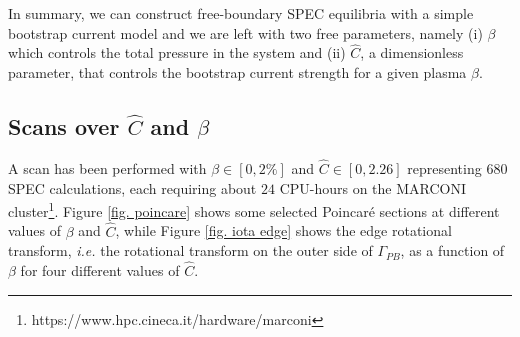 \documentclass[my_thesis.tex]{subfiles}
\begin{document}
In summary, we can construct free-boundary SPEC equilibria with a simple bootstrap current model and we are left with two free parameters, namely (i) $\beta$ which controls the total pressure in the system and (ii) $\hat{C}$, a dimensionless parameter, that controls the bootstrap current strength for a given plasma $\beta$. 
	
	
	






\subsection{Scans over $\hat{C}$ and $\beta$}
A scan has been performed with $\beta\in[0,2\%]$ and $\hat{C}\in[0,2.26]$ representing $680$ SPEC calculations, each requiring about $24$ CPU-hours on the MARCONI cluster\footnote{https://www.hpc.cineca.it/hardware/marconi}. Figure \ref{fig. poincare} shows some selected Poincar\'e sections at different values of $\beta$ and $\hat{C}$, while Figure \ref{fig. iota edge} shows the edge rotational transform, \textit{i.e.} the rotational transform on the outer side of $\Gamma_{PB}$, as a function of $\beta$ for four different values of $\hat{C}$.
\end{document}
